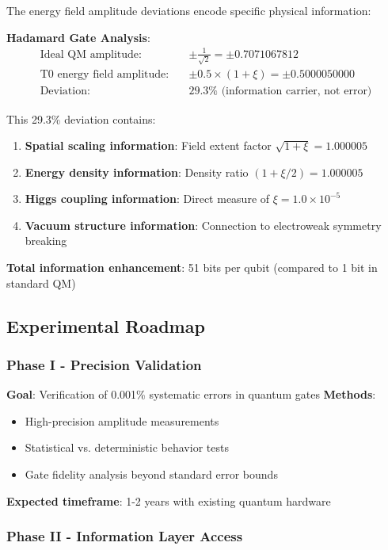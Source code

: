	The energy field amplitude deviations encode specific physical information:
	
	\textbf{Hadamard Gate Analysis}:
	\begin{align}
		\text{Ideal QM amplitude:} \quad &\pm \frac{1}{\sqrt{2}} = \pm 0.7071067812 \\
		\text{T0 energy field amplitude:} \quad &\pm 0.5 \times (1 + \xi) = \pm 0.5000050000 \\
		\text{Deviation:} \quad &29.3\% \text{ (information carrier, not error)}
	\end{align}
	
	This 29.3\% deviation contains:
	\begin{enumerate}
		\item \textbf{Spatial scaling information}: Field extent factor $\sqrt{1+\xi} = 1.000005$
		\item \textbf{Energy density information}: Density ratio $(1+\xi/2) = 1.000005$
		\item \textbf{Higgs coupling information}: Direct measure of $\xi = 1.0 \times 10^{-5}$
		\item \textbf{Vacuum structure information}: Connection to electroweak symmetry breaking
	\end{enumerate}
	
	\textbf{Total information enhancement}: 51 bits per qubit (compared to 1 bit in standard QM)
	
	\subsection{Experimental Roadmap}
	
	\subsubsection{Phase I - Precision Validation}
	
	\textbf{Goal}: Verification of 0.001\% systematic errors in quantum gates
	\textbf{Methods}: 
	\begin{itemize}
		\item High-precision amplitude measurements
		\item Statistical vs. deterministic behavior tests
		\item Gate fidelity analysis beyond standard error bounds
	\end{itemize}
	\textbf{Expected timeframe}: 1-2 years with existing quantum hardware
	
	\subsubsection{Phase II - Information Layer Access}
	
